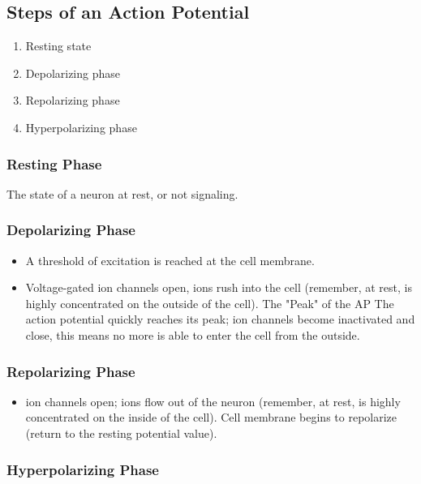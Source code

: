 \documentclass[12pt,a4paper]{article}
\begin{document}
	\subsection{Steps of an Action Potential}
	
	\begin{enumerate}
		\item Resting state 
		\item Depolarizing phase
		\item Repolarizing phase
		\item Hyperpolarizing phase
	\end{enumerate}
	
	\subsubsection{Resting Phase}
	
	The state of a neuron at rest, or not signaling. 
	
	\subsubsection{Depolarizing Phase}
	
	\begin{itemize}
		\item A threshold of excitation is reached at the cell membrane. 
		\item Voltage-gated  ion channels open,  ions rush into the cell (remember, at rest,  is highly concentrated on the outside of the cell).
		\subitem The "Peak" of the AP
		\subsubitem The action potential quickly reaches its peak;  ion channels become inactivated and close, this means no more  is able to enter the cell from the outside. 
	\end{itemize}
	
	\subsubsection{Repolarizing Phase}
	\begin{itemize}
		\item {} ion channels open;  ions flow out of the neuron (remember, at rest,  is highly concentrated on the inside of  the cell).
		\subitem Cell membrane begins to repolarize (return to the resting potential value). 
	\end{itemize}
	
	\subsubsection{Hyperpolarizing Phase}
	
\end{document}
